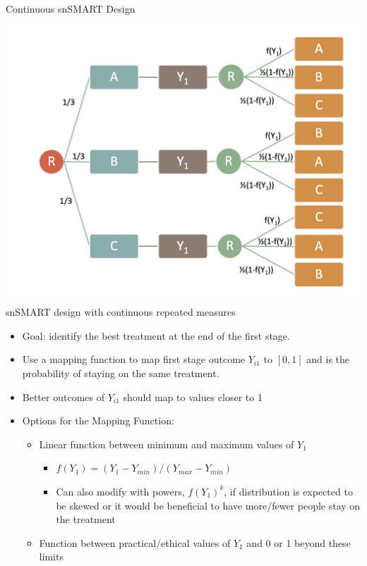 \documentclass[pdftex]{beamer}
\begin{document}
\begin{frame}{Continuous snSMART Design}
\begin{center}
\includegraphics[scale=.2]{csnsmart.jpg}
\end{center}
\end{frame}


\begin{frame}{snSMART design with continuous repeated measures}

\begin{itemize}
\item Goal: identify the best treatment at the end of the first stage.
\item Use a mapping function to map first stage outcome $Y_{i1}$ to $\left[0,1\right]$ and is the probability of staying on the same treatment.
\item Better outcomes of $Y_{i1}$ should map to values closer to 1
\item Options for the Mapping Function:
\begin{itemize}
\item Linear function between minimum and maximum values of $Y_1$
\begin{itemize}
\item $f(Y_1) = (Y_1- Y_{min})/(Y_{max} - Y_{min})$
\item Can also modify with powers, $f(Y_1)^k$, if distribution is expected to be skewed or it would be beneficial to have more/fewer people stay on the treatment 
\end{itemize}
\item Function between practical/ethical values of $Y_1$ and 0 or 1 beyond these limits
\end{itemize}
\end{itemize}
\end{frame}
\end{document}
